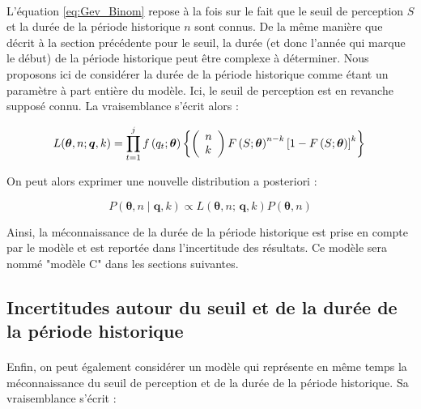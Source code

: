 \documentclass[11pt]{article}
\begin{document}
		\paragraph{}
		L'équation \ref{eq:Gev_Binom} repose à la fois sur le fait que le seuil de perception $S$ et la durée de la période historique $n$ sont connus. De la même manière que décrit à la section précédente pour le seuil, la durée (et donc l'année qui marque le début) de la période historique peut être complexe à déterminer. Nous proposons ici de considérer la durée de la période historique comme étant un paramètre à part entière du modèle. Ici, le seuil de perception est en revanche supposé connu. La vraisemblance s'écrit alors : 
		 
				\begin{equation}
				L(\boldsymbol{\theta}, n ; \boldsymbol{q}, k) = \prod_{t=1}^j f\left(q_t;\boldsymbol{\theta}\right) \left\{\left(\begin{array}{l}
				n \\
				k
				\end{array}\right) F\left(S;\boldsymbol{\theta}\right)^{n-k}\left[1-F\left(S;\boldsymbol{\theta}\right)\right]^k\right\} \\
				\label{eq:Gev_Binom_uN}
				\end{equation}
				
		On peut alors exprimer une nouvelle distribution a posteriori :
		
				\begin{equation}
					P(\boldsymbol{\theta}, n \mid \boldsymbol{q},k) \propto L(\boldsymbol{\theta},n;\,\boldsymbol{q},k) P(\boldsymbol{\theta},n)
					\label{eq:Bayes_uN}
				\end{equation}
			
		Ainsi, la méconnaissance de la durée de la période historique est prise en compte par le modèle et est reportée dans l'incertitude des résultats. Ce modèle sera nommé "modèle C" dans les sections suivantes. 
	
	\subsection{Incertitudes autour du seuil et de la durée de la période historique}
	
	\paragraph{}
	Enfin, on peut également considérer un modèle qui représente en même temps la méconnaissance du seuil de perception et de la durée de la période historique. Sa vraisemblance s'écrit :  
	
\end{document}
